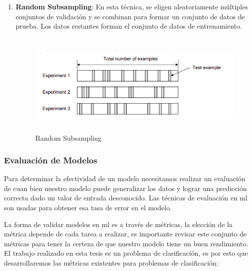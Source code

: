\begin{enumerate}
\item \textbf{Random Subsampling}: En esta técnica, se eligen aleatoriamente múltiples conjuntos de validación y se combinan para formar un conjunto de datos de prueba. Los datos restantes forman el conjunto de datos de entrenamiento.

\begin{figure}[H]
 \centering
  \includegraphics[height=5cm,keepaspectratio=true,clip=true]{imagenes/MarcoTeorico/cross-validation-random.png}
  \caption{Random Subsampling}
	\label{Fig: random-Subsampling}
\end{figure}

\end{enumerate}



\subsubsection{Evaluación de Modelos}\label{sub:evaluación-modelo}
Para determinar la efectividad de un modelo necesitamos realizar un evaluación de cuan bien nuestro modelo puede generalizar los datos y lograr una predicción correcta dado un valor de entrada desconocido. Las técnicas de evaluación en \ac{ml} son usadas para obtener esa tasa de error en el modelo. 

La forma de validar modelos en \ac{ml} es a través de métricas, la elección de la métrica depende de cada tarea a realizar, es importante revisar este conjunto de métricas para tener la certeza de que nuestro modelo tiene un buen rendimiento. El trabajo realizado en esta tesis es un problema de clasificación, es por esto que desarrollaremos las métricas existentes para problemas de clasificación:

